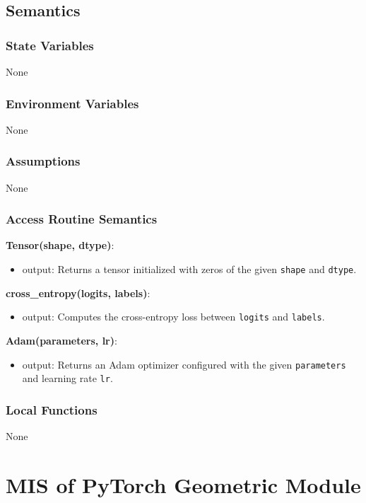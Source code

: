 \documentclass[12pt, titlepage]{article}
\begin{document}
\subsection{Semantics}

\subsubsection{State Variables}
None

\subsubsection{Environment Variables}
None

\subsubsection{Assumptions}
None

\subsubsection{Access Routine Semantics}

\textbf{Tensor(shape, dtype)}:
\begin{itemize}
  \item output: Returns a tensor initialized with zeros of the given \texttt{shape} and \texttt{dtype}.
\end{itemize}

\textbf{cross\_entropy(logits, labels)}:
\begin{itemize}
  \item output: Computes the cross-entropy loss between \texttt{logits} and \texttt{labels}.
\end{itemize}

\textbf{Adam(parameters, lr)}:
\begin{itemize}
  \item output: Returns an Adam optimizer configured with the given \texttt{parameters} and learning rate \texttt{lr}.
\end{itemize}

\subsubsection{Local Functions}
None

\newpage

\section{MIS of PyTorch Geometric Module} \label{PyGModule}
\end{document}
